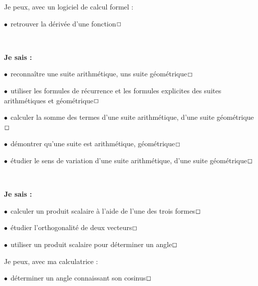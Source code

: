 \documentclass[a4paper,11pt]{article}
\begin{document}
\begin{coutil}
\selectfont\small
Je peux, avec un logiciel de calcul formel :

\tabula{}$\bullet~~$retrouver la dérivée d'une fonction\dotfill{}$\Large\Box$
\end{coutil}

\color{titrebleu}\,\hrulefill\,

\begin{casavoir}
\selectfont\small
\textbf{Je sais :}

\tabula{}$\bullet~~$reconnaître une suite arithmétique, uns suite géométrique\dotfill{}$\Large\Box$

\tabula{}$\bullet~~$utiliser les formules de récurrence et les formules explicites des suites arithmétiques et géométrique\dotfill{}$\Large\Box$

\tabula{}$\bullet~~$calculer la somme des termes d'une suite arithmétique, d'une suite géométrique\dotfill{}$\Large\Box$

\tabula{}$\bullet~~$démontrer qu'une suite est arithmétique, géométrique\dotfill{}$\Large\Box$

\tabula{}$\bullet~~$étudier le sens de variation d'une suite arithmétique, d'une suite géométrique\dotfill{}$\Large\Box$
\end{casavoir}

\color{titrebleu}\,\hrulefill

\begin{casavoir}
\selectfont\small
\textbf{Je sais :}

\tabula{}$\bullet~~$calculer un produit scalaire à l'aide de l'une des trois formes\dotfill{}$\Large\Box$

\tabula{}$\bullet~~$étudier l'orthogonalité de deux vecteurs\dotfill{}$\Large\Box$

\tabula{}$\bullet~~$utiliser un produit scalaire pour déterminer un angle\dotfill{}$\Large\Box$
\end{casavoir}

\begin{ccalco}
\selectfont\small
Je peux, avec ma calculatrice :

\tabula{}$\bullet~~$déterminer un angle connaissant son cosinus\dotfill{}$\Large\Box$
\end{ccalco}

\pagebreak
\end{document}
